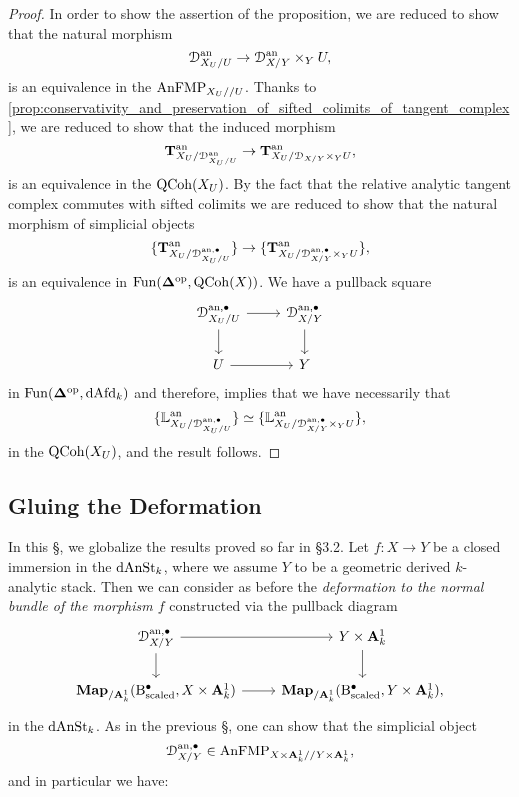 \documentclass[10pt,a4paper,reqno]{amsart} %
\theoremstyle{plain}
\theoremstyle{definition}
\theoremstyle{remark}
\numberwithin{equation}{section}
\begin{document}
\begin{proof}
    In order to show the assertion of the proposition, we are reduced to show that the natural morphism
        \[
            \mathcal D_{X_U/ U}^\mathrm{an} \to \mathcal D^\mathrm{an}_{X/ Y} \times_Y U,  
        \]
    is an equivalence in the \infcat $\mathrm{AnFMP}_{X_U/ /U}$. Thanks to \cref{prop:conservativity_and_preservation_of_sifted_colimits_of_tangent_complex}, we are reduced to show
    that the induced morphism
        \[
            \mathbf T^\mathrm{an}_{X_U/ \mathcal D_{X_U/ U}^\mathrm{an}} \to \mathbf T^\mathrm{an}_{X_U/ \mathcal D_{X/ Y} \times_Y U},
        \]
    is an equivalence in the \infcat $\mathrm{QCoh}(X_U)$. By the fact that the relative analytic tangent complex commutes with sifted colimits we are reduced to show that
    the natural morphism of simplicial objects
        \[
            \{ \mathbf T^\mathrm{an}_{X_U/ \mathcal D_{X_U/ U}^{\mathrm{an}, \bullet}} \} \to \{ \mathbf T^\mathrm{an}_{X_U/ \mathcal D_{X/ Y}^{\mathrm{an}, \bullet} \times_Y U} \},
        \]
    is an equivalence in $\operatorname{Fun}(\bm{\Delta}^\mathrm{op}, \mathrm{QCoh}(X))$. We have a pullback square
        \[
        \begin{tikzcd}
            \cD_{X_U/ U}^{\mathrm{an}, \bullet} \ar{r} \ar{d} & \cD_{X/ Y}^{\mathrm{an}, \bullet} \ar{d} \\
            U \ar{r} & Y  
        \end{tikzcd}
        \]
    in $\mathrm{Fun}(\bm{\Delta} ^\mathrm{op}, \mathrm{dAfd}_k)$ and therefore, \cite[Proposition 5.12]{Porta_Yu_Representability} implies that we have necessarily that
        \[
            \{ \mathbb L^\mathrm{an}_{X_U/ \mathcal D_{X_U/ U}^{\mathrm{an}, \bullet}} \} \simeq \{ \mathbb L^\mathrm{an}_{X_U /\mathcal D_{X/ Y}^{\mathrm{an}, \bullet} \times_Y U} \},    
        \]
    in the \infcat $\mathrm{QCoh}(X_U)$, and the result follows.
\end{proof}





\subsection{Gluing the Deformation} In this \S, we globalize the results proved so far in \S 3.2. Let $f \colon X \to Y$ be a closed immersion
in the \infcat $\mathrm{dAnSt}_k$, where we assume $Y$ to be a geometric derived $k$-analytic stack.
Then we can consider as before the \emph{deformation to the normal bundle of the morphism $f$} constructed via the pullback diagram
    \[
    \begin{tikzcd}
        \cD^{\mathrm{an}, \bullet}_{X/ Y} \ar{r} \ar{d} & Y \times \bA^1_k \ar{d} \\
        \bfMap_{/ \bA^1_k} (\rB^\bullet_\mathrm{scaled}, X \times \bA^1_k) \ar{r} & \bfMap_{/ \bA^1_k}(\rB^\bullet_{\mathrm{scaled}}, Y \times \bA^1_k),
    \end{tikzcd}
    \]
in the \infcat $\mathrm{dAnSt}_k$. As in the previous \S, one can show that the simplicial object 
    \[
        \mathcal D^{\mathrm{an}, \bullet}_{X/ Y} \in \mathrm{AnFMP}_{X \times \mathbf A^1_k/ /Y \times \mathbf A^1_k},  
    \]
and in particular we have:
\end{document}
